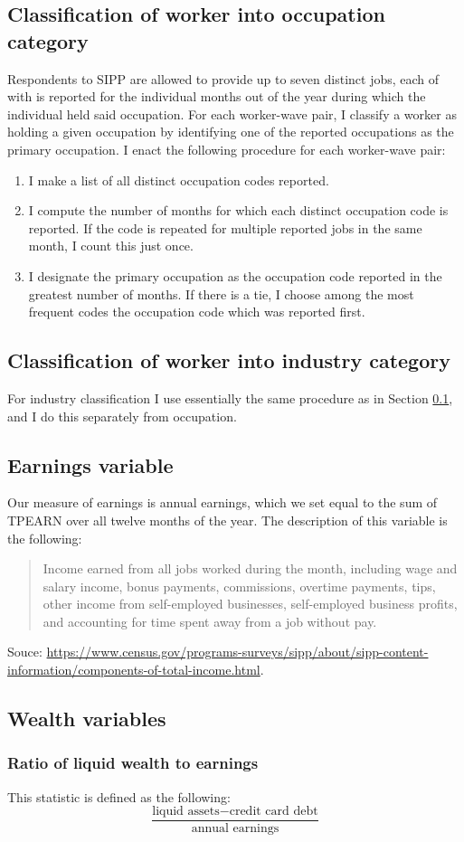 \documentclass{article}
\begin{document}
\subsection{Classification of worker into occupation category}
\label{sipp_occupation}
Respondents to SIPP are allowed to provide up to seven distinct jobs, each of with is reported for the individual months out of the year during which the individual held said occupation.
For each worker-wave pair, I classify a worker as holding a given occupation by identifying one of the reported occupations as the primary occupation. I enact the following procedure for each worker-wave pair:
\begin{enumerate}
\item I make a list of all distinct occupation codes reported.
\item I compute the number of months for which each distinct occupation code is reported. If the code is repeated for multiple reported jobs in the same month, I count this just once.
\item I designate the primary occupation as the occupation code reported in the greatest number of months. If there is a tie, I choose among the most frequent codes the occupation code which was reported first.
\end{enumerate}

\subsection{Classification of worker into industry category}
For industry classification I use essentially the same procedure as in Section \ref{sipp_occupation}, and I do this separately from occupation.

\subsection{Earnings variable}
Our measure of earnings is annual earnings, which we set equal to the sum of TPEARN over all twelve months of the year. The description of this variable is the following:
\begin{quote}
Income earned from all jobs worked during the month, including wage and salary income, bonus payments, commissions, overtime payments, tips, other income from self-employed businesses, self-employed business profits, and accounting for time spent away from a job without pay.
\end{quote}
Souce: \url{https://www.census.gov/programs-surveys/sipp/about/sipp-content-information/components-of-total-income.html}.

\subsection{Wealth variables}
\subsubsection{Ratio of liquid wealth to earnings}
This statistic is defined as the following:
$$
\frac{\text{liquid assets} - \text{credit card debt}}{\text{annual earnings}}
$$




\end{document}

